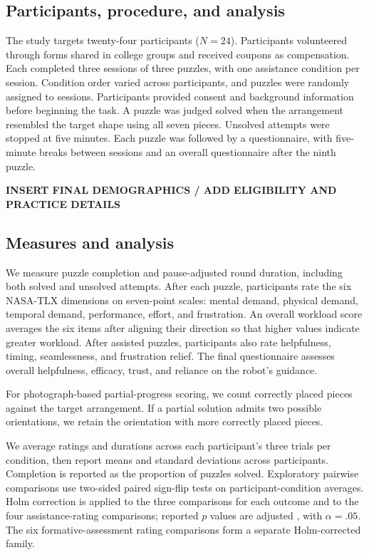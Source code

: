 \documentclass[sigconf,anonymous,balance=false]{aamas}
\providecommand{\DIFadd}[1]{{\protect\color{blue} \sf #1}} %
\providecommand{\DIFdel}[1]{{\protect\color{red} \scriptsize #1}} %
\providecommand{\DIFaddbegin}{} %
\providecommand{\DIFaddend}{} %
\providecommand{\DIFdelbegin}{} %
\providecommand{\DIFdelend}{} %
\begin{document}
\DIFdelbegin \subsection{\DIFdel{Participants, procedure, and analysis}}
\addtocounter{subsection}{-1}%

\DIFdelend The study targets twenty-four participants ($N=24$). Participants volunteered through forms shared in college groups and received coupons as compensation. Each completed three sessions of three puzzles, with one assistance condition per session. Condition order varied across participants, and puzzles were randomly assigned to sessions. Participants provided consent and background information before beginning the task. A puzzle was judged solved when the arrangement resembled the target shape using all seven pieces. Unsolved attempts were stopped at five minutes. Each puzzle was followed by a questionnaire, with five-minute breaks between sessions and an overall questionnaire after the ninth puzzle.

\textbf{INSERT FINAL DEMOGRAPHICS / ADD ELIGIBILITY AND PRACTICE DETAILS}

\DIFaddbegin \subsection{\DIFadd{Measures and analysis}}

\DIFaddend We measure puzzle completion and pause-adjusted round duration, including both solved and unsolved attempts. After each puzzle, participants rate the six NASA-TLX dimensions on seven-point scales: mental demand, physical demand, temporal demand, performance, effort, and frustration. An overall workload score averages the six items after aligning their direction so that higher values indicate greater workload. After assisted puzzles, participants also rate helpfulness, timing, seamlessness, and frustration relief. The final questionnaire assesses overall helpfulness, efficacy, trust, and reliance on the robot's guidance.

\DIFaddbegin \DIFadd{For photograph-based partial-progress scoring, we count correctly placed pieces against the target arrangement. If a partial solution admits two possible orientations, we retain the orientation with more correctly placed pieces.
}

\DIFaddend We average ratings and durations across each participant's three trials per condition, then report means and standard deviations across participants. Completion is reported as the proportion of puzzles solved. Exploratory pairwise comparisons use two-sided paired sign-flip tests on participant-condition averages. Holm correction is applied to the three comparisons for each outcome and to the four assistance-rating comparisons; reported $p$ values are adjusted\DIFaddbegin \DIFadd{, with $\alpha=.05$. The six formative-assessment rating comparisons form a separate Holm-corrected family}\DIFaddend .
\end{document}
